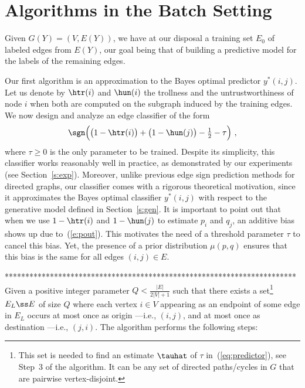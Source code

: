 \section{Algorithms in the Batch Setting}\label{s:algbatch}
Given $G(Y) =(V,E(Y))$, we have at our disposal a training set $E_0$ of labeled edges from $E(Y)$, our goal being that of building a predictive model for the labels of the remaining edges.

Our first algorithm is an approximation to the Bayes optimal predictor $y^*(i,j)$. Let us denote by $\htr(i)$ and $\hun(i)$ the trollness and the untrustworthiness of node $i$ when both are computed on the subgraph induced by the training edges. We now design and analyze an edge classifier of the form
%
\begin{equation}
\label{eq:predictor}
	\sgn\Big(\big(1-\htr(i)\big) + \big(1-\hun(j)\big) - \tfrac{1}{2} -\tau\Big)~,
\end{equation}
%
where $\tau \ge 0$ is the only parameter to be trained. Despite its simplicity, this classifier works reasonably well in practice, as demonstrated by our experiments (see Section~\ref{s:exp}). Moreover, unlike previous edge sign prediction methods for directed graphs, our classifier comes with a rigorous theoretical motivation, since it approximates the Bayes optimal classifier $y^*(i,j)$ with respect to the generative model defined in Section~\ref{s:gen}. It is important to point out that when we use $1-\htr(i)$ and $1-\hun(j)$ to estimate $p_i$ and $q_j$, an additive bias shows up due to~(\ref{e:pout}). This motivates the need of a threshold parameter $\tau$ to cancel this bias. Yet, the presence of a prior distribution $\mu(p,q)$ ensures that this bias is the same for all edges $(i,j) \in E$. 

%

\iffalse
***********************************************************************
Given a positive integer parameter $Q < \tfrac{|E|}{2|V|+1}$ such that there exists a set\footnote
{
This set is needed to find an estimate $\tauhat$ of $\tau$ in~(\ref{eq:predictor}), see Step~3 of the algorithm. It can be any set of directed paths/cycles in $G$ that are pairwise vertex-disjoint.
}
$E_L \ss E$ of size $Q$ where each vertex $i \in V$ appearing as an endpoint of some edge in $E_L$ occurs at most once as origin ---i.e., $(i,j)$, and at most once as destination ---i.e., $(j,i)$. The algorithm performs the following steps:

